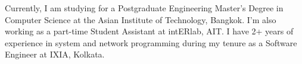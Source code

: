 

\begin{cvparagraph}

Currently, I am studying for a Postgraduate Engineering Master’s Degree in Computer Science at the Asian Institute of Technology, Bangkok. I’m also working as a part-time Student Assistant at intERlab, AIT. I have 2+ years of experience in system and network programming during my tenure as a Software Engineer at IXIA, Kolkata.
\end{cvparagraph}
